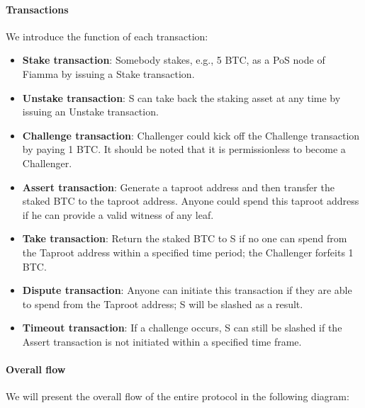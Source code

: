 \paragraph{Transactions}

We introduce the function of each transaction:

\begin{itemize}
    \item \textbf{Stake transaction}: Somebody stakes, e.g., 5 BTC, as a PoS node of Fiamma by issuing a Stake transaction.
    \item \textbf{Unstake transaction}: S can take back the staking asset at any time by issuing an Unstake transaction.
    \item \textbf{Challenge transaction}: Challenger could kick off the Challenge transaction by paying 1 BTC. It should be noted that it is permissionless to become a Challenger.
    \item \textbf{Assert transaction}: Generate a taproot address and then transfer the staked BTC to the taproot address. Anyone could spend this taproot address if he can provide a valid witness of any leaf.
    \item \textbf{Take transaction}: Return the staked BTC to S if no one can spend from the Taproot address within a specified time period; the Challenger forfeits 1 BTC.
    \item \textbf{Dispute transaction}: Anyone can initiate this transaction if they are able to spend from the Taproot address; S will be slashed as a result.
    \item \textbf{Timeout transaction}: If a challenge occurs, S can still be slashed if the Assert transaction is not initiated within a specified time frame.
\end{itemize}


\paragraph{Overall flow}

We will present the overall flow of the entire protocol in the following diagram:

